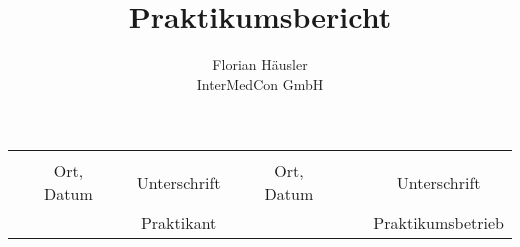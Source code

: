 \documentclass [ngerman,a4paper,twoside,12pt,listof=totoc]{scrreprt} %
\title{Praktikumsbericht}
\subtitle{Florian Häusler \\ InterMedCon GmbH}
\begin{document}
%

\maketitle
\tableofcontents
%
\listoffigures%














%
%
\printglossary[title=Glossar] %
\newpage
\vspace*{\fill} 
\begin{tabular}{ccccccccc}
	&   &   &  & & & & & \\\cline{1-2}\cline{4-4} \cline{6-7} \cline{9-9}
	
	& Ort, Datum & & Unterschrift && Ort, Datum & & & Unterschrift  \\
	&					&&	Praktikant	&&						&&& Praktikumsbetrieb
	
\end{tabular}









\end{document}
